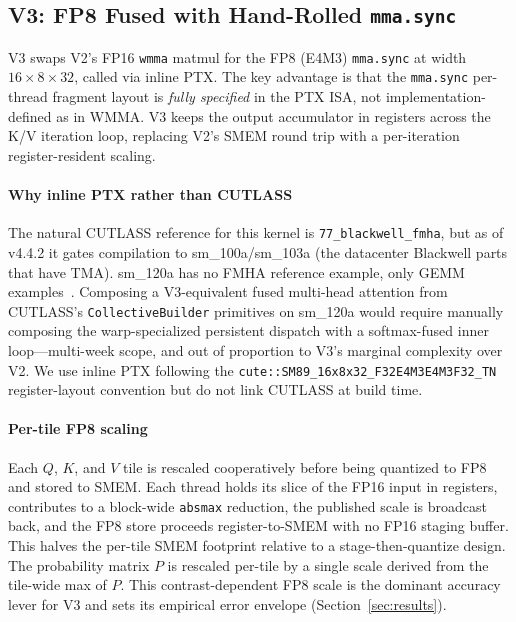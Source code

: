 \documentclass[conference]{IEEEtran}
\begin{document}
\subsection{V3: FP8 Fused with Hand-Rolled \texttt{mma.sync}}
\label{sec:method:v3}

V3 swaps V2's FP16 \texttt{wmma} matmul for the FP8 (E4M3)
\texttt{mma.sync} at width $16{\times}8{\times}32$, called via inline
PTX. The key advantage is that the \texttt{mma.sync} per-thread
fragment layout is \emph{fully specified} in the PTX ISA, not
implementation-defined as in WMMA. V3 keeps the output accumulator
in registers across the K/V iteration loop, replacing V2's SMEM
round trip with a per-iteration register-resident scaling.

\paragraph*{Why inline PTX rather than CUTLASS}
The natural CUTLASS reference for this kernel is
\texttt{77\_blackwell\_fmha}, but as of v4.4.2 it gates compilation
to sm\_100a/sm\_103a (the datacenter Blackwell parts that have
TMA). sm\_120a has no FMHA reference example, only GEMM
examples~\cite{nvidia2024cutlass}. Composing a V3-equivalent fused
multi-head attention from CUTLASS's \texttt{CollectiveBuilder}
primitives on sm\_120a would require manually composing the
warp-specialized persistent dispatch with a softmax-fused inner
loop---multi-week scope, and out of proportion to V3's marginal
complexity over V2. We use inline PTX following the
\texttt{cute::SM89\_16x8x32\_F32E4M3E4M3F32\_TN} register-layout
convention but do not link CUTLASS at build time.

\paragraph*{Per-tile FP8 scaling}
Each $Q$, $K$, and $V$ tile is rescaled cooperatively before being
quantized to FP8 and stored to SMEM. Each thread holds its slice of
the FP16 input in registers, contributes to a block-wide
\texttt{absmax} reduction, the published scale is broadcast back,
and the FP8 store proceeds register-to-SMEM with no FP16 staging
buffer. This halves the per-tile SMEM footprint relative to a
stage-then-quantize design. The probability matrix $P$ is rescaled
per-tile by a single scale derived from the tile-wide max of $P$.
This contrast-dependent FP8 scale is the dominant accuracy lever
for V3 and sets its empirical error envelope
(Section~\ref{sec:results}).
\end{document}
